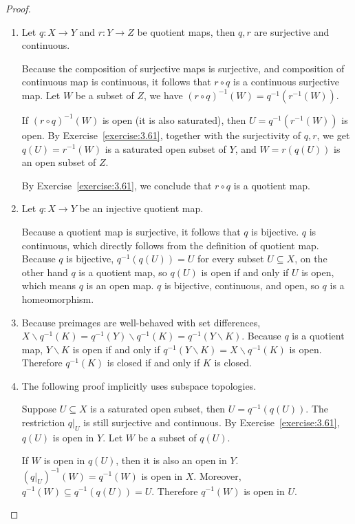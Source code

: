 \begin{proof}
	\begin{enumerate}[label={(\alph*)}]
		\item Let $q: X\to Y$ and $r: Y\to Z$ be quotient maps, then $q, r$ are surjective and continuous.

		      Because the composition of surjective maps is surjective, and composition of continuous map is continuous, it follows that $r\circ q$ is a continuous surjective map. Let $W$ be a subset of $Z$, we have ${(r\circ q)}^{-1}(W) = q^{-1}(r^{-1}(W))$.

		      If ${(r\circ q)}^{-1}(W)$ is open (it is also saturated), then $U = q^{-1}(r^{-1}(W))$ is open. By Exercise~\ref{exercise:3.61}, together with the surjectivity of $q, r$, we get $q(U) = r^{-1}(W)$ is a saturated open subset of $Y$, and $W = r(q(U))$ is an open subset of $Z$.

		      By Exercise~\ref{exercise:3.61}, we conclude that $r\circ q$ is a quotient map.
		\item Let $q: X\to Y$ be an injective quotient map.

		      Because a quotient map is surjective, it follows that $q$ is bijective. $q$ is continuous, which directly follows from the definition of quotient map. Because $q$ is bijective, $q^{-1}(q(U)) = U$ for every subset $U\subseteq X$, on the other hand $q$ is a quotient map, so $q(U)$ is open if and only if $U$ is open, which means $q$ is an open map. $q$ is bijective, continuous, and open, so $q$ is a homeomorphism.
		\item Because preimages are well-behaved with set differences, $X\smallsetminus q^{-1}(K) = q^{-1}(Y)\smallsetminus q^{-1}(K) = q^{-1}(Y\smallsetminus K)$. Because $q$ is a quotient map, $Y\smallsetminus K$ is open if and only if $q^{-1}(Y\smallsetminus K) = X\smallsetminus q^{-1}(K)$ is open. Therefore $q^{-1}(K)$ is closed if and only if $K$ is closed.
		\item The following proof implicitly uses subspace topologies.

		      Suppose $U\subseteq X$ is a saturated open subset, then $U = q^{-1}(q(U))$. The restriction $q\vert_{U}$ is still surjective and continuous. By Exercise~\ref{exercise:3.61}, $q(U)$ is open in $Y$. Let $W$ be a subset of $q(U)$.

		      If $W$ is open in $q(U)$, then it is also an open in $Y$. ${(q\vert_{U})}^{-1}(W) = q^{-1}(W)$ is open in $X$. Moreover, $q^{-1}(W)\subseteq q^{-1}(q(U)) = U$. Therefore $q^{-1}(W)$ is open in $U$.


\end{enumerate}
\end{proof}
